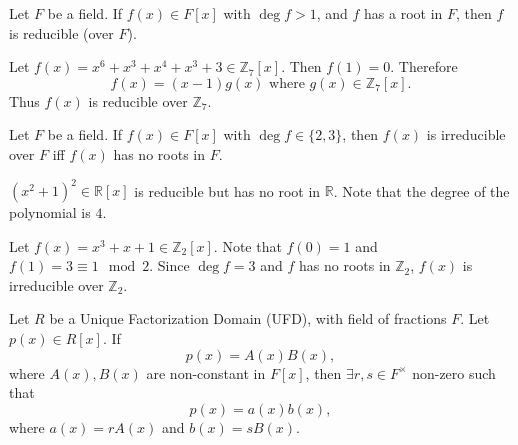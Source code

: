 \documentclass[notoc,notitlepage,nobib]{tufte-book}
\begin{document}
\begin{propo}\label{propo:polynomials_with_roots_are_reducible}
  Let $F$ be a field. If $f(x) \in F[x]$ with $\deg f > 1$, and $f$ has a root in $F$,
  then $f$ is reducible (over $F$).
\end{propo}

\begin{eg}
  Let $f(x) = x^6 + x^3 + x^4 + x^3 + 3 \in \mathbb{Z}_7[x]$. Then $f(1) = 0$.
  Therefore
  \begin{equation*}
    f(x) = (x - 1) g(x) \text{ where } g(x) \in \mathbb{Z}_7[x].
  \end{equation*}
  Thus $f(x)$ is reducible over $\mathbb{Z}_7$.
\end{eg}

\begin{propo}\label{propo:irreducible_rootless_polynomials}
  Let $F$ be a field. If $f(x) \in F[x]$ with $\deg f \in \{ 2, 3 \}$, then $f(x)$ is irreducible over $F$
  iff $f(x)$ has no roots in $F$.
\end{propo}

\begin{warning}
  $(x^2 + 1)^2 \in \mathbb{R}[x]$ is reducible but has no root in $\mathbb{R}$. Note that
  the degree of the polynomial is $4$.
\end{warning}

\begin{eg}
  Let $f(x) = x^3 + x + 1 \in \mathbb{Z}_2[x]$. Note that $f(0) = 1$ and 
  $f(1) = 3 \equiv 1 \mod 2$. Since $\deg f = 3$ and $f$ has no roots in $\mathbb{Z}_2$,
  $f(x)$ is irreducible over $\mathbb{Z}_2$.
\end{eg}

\begin{thm}\label{thm:gauss_lemma}
  Let $R$ be a Unique Factorization Domain (UFD), with field of fractions $F$.
  Let $p(x) \in R[x]$. If
  \begin{equation*}
    p(x) = A(x) B(x),
  \end{equation*}
  where $A(x), B(x)$ are non-constant in $F[x]$, then 
  $\exists r, s \in F^\times$ non-zero such that
  \begin{equation*}
    p(x) = a(x) b(x),
  \end{equation*}
  where $a(x) = rA(x)$ and $b(x) = sB(x)$.
\end{thm}
\end{document}
